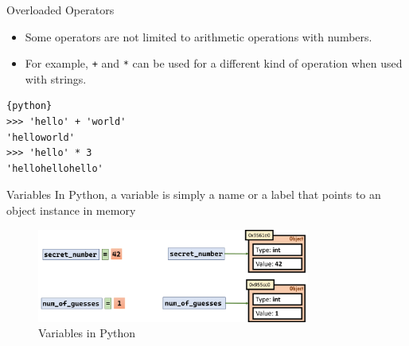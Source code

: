 \documentclass{beamer}
\begin{document}
\begin{frame}[fragile]{Overloaded Operators}
    \begin{itemize}
        \item Some operators are not limited to arithmetic operations with numbers.
        \item For example, \texttt{+} and \texttt{*} can be used for a different kind of operation when used with strings.
    \end{itemize}
    \begin{lstlisting}{python}
>>> 'hello' + 'world'
'helloworld'
>>> 'hello' * 3
'hellohellohello'
    \end{lstlisting}
\end{frame}

\begin{frame}{Variables}
    In Python, a variable is simply a name or a label that points to an object instance in memory
    \begin{figure}
        \centering
        \includegraphics[width=0.8\textwidth]{pics/variable.png}
        \caption{Variables in Python}
    \end{figure}
\end{frame}
\end{document}
